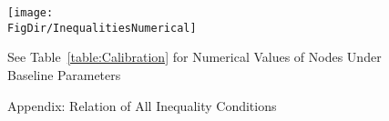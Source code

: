 \begin{figure}[ht]
  \centerline{
    \texttt{[image: \\FigDir/InequalitiesNumerical]}
  }
  \caption{Appendix: Relation of All Inequality Conditions} \label{fig:InequalitiesNumerical}
\centerline{See Table~\ref{table:Calibration} for Numerical Values of Nodes Under Baseline Parameters}
\end{figure}
